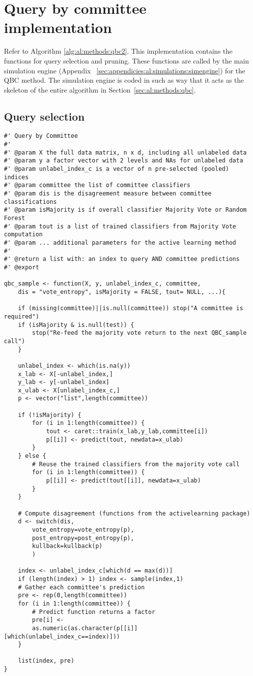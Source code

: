 \section{Query by committee implementation}
\label{sec:appendicies:al:qbc}

Refer to Algorithm \ref{alg:al:methods:qbc2}. 
This implementation contains the functions for query selection and pruning. 
These functions are called by the main simulation engine (Appendix 
~\ref{sec:appendicies:al:simulations:simengine}) for the QBC method. 
The simulation engine is coded in such as way that it acts as the skeleton 
of the entire algorithm in Section~\ref{sec:al:methods:qbc}.
\subsection{Query selection}
{
\begin{lstlisting}
#' Query by Committee
#'
#' @param X the full data matrix, n x d, including all unlabeled data
#' @param y a factor vector with 2 levels and NAs for unlabeled data
#' @param unlabel_index_c is a vector of n pre-selected (pooled) indices
#' @param committee the list of committee classifiers
#' @param dis is the disagreement measure between committee classifications
#' @param isMajority is if overall classifier Majority Vote or Random Forest
#' @param tout is a list of trained classifiers from Majority Vote computation 
#' @param ... additional parameters for the active learning method
#'
#' @return a list with: an index to query AND committee predictions
#' @export

qbc_sample <- function(X, y, unlabel_index_c, committee,
	dis = "vote_entropy", isMajority = FALSE, tout= NULL, ...){
	
	if (missing(committee)||is.null(committee)) stop("A committee is required")
	if (isMajority & is.null(test)) {
		stop("Re-feed the majority vote return to the next QBC_sample call")
	}
	
	unlabel_index <- which(is.na(y))
	x_lab <- X[-unlabel_index,]
	y_lab <- y[-unlabel_index]
	x_ulab <- X[unlabel_index_c,]
	p <- vector("list",length(committee))
	
	if (!isMajority) {
		for (i in 1:length(committee)) {
			tout <- caret::train(x_lab,y_lab,committee[i])
			p[[i]] <- predict(tout, newdata=x_ulab)
		}
	} else {
		# Reuse the trained classifiers from the majority vote call
		for (i in 1:length(committee)) {
			p[[i]] <- predict(tout[[i]], newdata=x_ulab)
		}
	}

	# Compute disagreement (functions from the activelearning package)
	d <- switch(dis,
		vote_entropy=vote_entropy(p),
		post_entropy=post_entropy(p),
		kullback=kullback(p)
		)
	
	index <- unlabel_index_c[which(d == max(d))]
	if (length(index) > 1) index <- sample(index,1)
	# Gather each committee's prediction
	pre <- rep(0,length(committee))
	for (i in 1:length(committee)) {
		# Predict function returns a factor
		pre[i] <- 
		as.numeric(as.character(p[[i]][which(unlabel_index_c==index)]))
	}
	
	list(index, pre)
}
\end{lstlisting}
}



